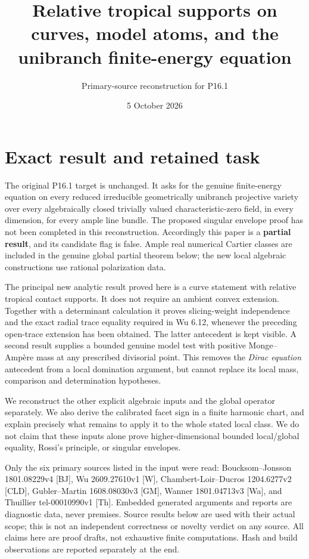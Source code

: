 \documentclass[
  11pt,
]{article}
\title{Relative tropical supports on curves, model atoms, and the
unibranch finite-energy equation}
\author{Primary-source reconstruction for P16.1}
\date{5 October 2026}
\begin{document}
\maketitle

\section{Exact result and retained
task}\label{exact-result-and-retained-task}

The original P16.1 target is unchanged. It asks for the genuine
finite-energy equation on every reduced irreducible geometrically
unibranch projective variety over every algebraically closed trivially
valued characteristic-zero field, in every dimension, for every ample
line bundle. The proposed singular envelope proof has not been completed
in this reconstruction. Accordingly this paper is a \textbf{partial
result}, and its candidate flag is false. Ample real numerical Cartier
classes are included in the genuine global partial theorem below; the
new local algebraic constructions use rational polarization data.

The principal new analytic result proved here is a curve statement with
relative tropical contact supports. It does not require an ambient
convex extension. Together with a determinant calculation it proves
slicing-weight independence and the exact radial trace equality required
in Wu 6.12, whenever the preceding open-trace extension has been
obtained. The latter antecedent is kept visible. A second result
supplies a bounded genuine model test with positive Monge--Ampère mass
at any prescribed divisorial point. This removes the \emph{Dirac
equation} antecedent from a local domination argument, but cannot
replace its local mass, comparison and determination hypotheses.

We reconstruct the other explicit algebraic inputs and the global
operator separately. We also derive the calibrated facet sign in a
finite harmonic chart, and explain precisely what remains to apply it to
the whole stated local class. We do not claim that these inputs alone
prove higher-dimensional bounded local/global equality, Rossi's
principle, or singular envelopes.

Only the six primary sources listed in the input were read:
Boucksom--Jonsson 1801.08229v4 {[}BJ{]}, Wu 2609.27610v1 {[}W{]},
Chambert-Loir--Ducros 1204.6277v2 {[}CLD{]}, Gubler--Martin 1608.08030v3
{[}GM{]}, Wanner 1801.04713v3 {[}Wa{]}, and Thuillier tel-00010990v1
{[}Th{]}. Embedded generated arguments and reports are diagnostic data,
never premises. Source results below are used with their actual scope;
this is not an independent correctness or novelty verdict on any source.
All claims here are proof drafts, not exhaustive finite computations.
Hash and build observations are reported separately at the end.
\end{document}
